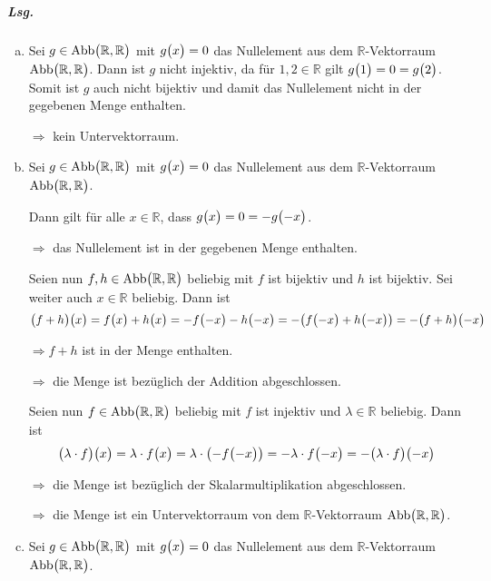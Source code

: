 \documentclass{scrreprt}
\begin{document}
  \subparagraph{Lsg.}
  \begin{enumerate}[(a)]
  \item Sei $g \in \text{Abb}\qty\big(\mathbb{R}, \mathbb{R})$ mit
    $g\qty\big(x) = 0$ das Nullelement aus dem $\mathbb{R}$-Vektorraum
    $\text{Abb}\qty\big(\mathbb{R}, \mathbb{R})$.
    Dann ist $g$ nicht injektiv, da für $1, 2 \in \mathbb{R}$ gilt
    $g\qty\big(1) = 0 = g\qty\big(2)$.
    Somit ist $g$ auch nicht bijektiv und damit das Nullelement nicht in der
    gegebenen Menge enthalten.

    $\Rightarrow$ kein Untervektorraum.

  \item Sei $g \in \text{Abb}\qty\big(\mathbb{R}, \mathbb{R})$ mit
    $g\qty\big(x) = 0$ das Nullelement aus dem $\mathbb{R}$-Vektorraum
    $\text{Abb}\qty\big(\mathbb{R}, \mathbb{R})$.

    Dann gilt für alle $x \in \mathbb{R}$, dass
    $g\qty\big(x) = 0 = -g\qty\big(-x)$.

    $\Rightarrow$ das Nullelement ist in der gegebenen Menge enthalten.

    Seien nun $f, h \in \text{Abb}\qty\big(\mathbb{R}, \mathbb{R})$ beliebig mit
    $f$ ist bijektiv und $h$ ist bijektiv.
    Sei weiter auch $x \in \mathbb{R}$ beliebig.
    Dann ist
    \[
      \qty\big(f + h)\qty\big(x) = f\qty\big(x) + h\qty\big(x)
      = -f\qty\big(-x) - h\qty\big(-x)
      = -\qty(f\qty\big(-x) + h\qty\big(-x))
      = -\qty\big(f + h)\qty\big(-x)
    \]

    $\Rightarrow f + h$ ist in der Menge enthalten.

    $\Rightarrow$ die Menge ist bezüglich der Addition abgeschlossen.

    Seien nun $f \in \text{Abb}\qty\big(\mathbb{R}, \mathbb{R})$ beliebig mit
    $f$ ist injektiv und $\lambda \in \mathbb{R}$ beliebig.
    Dann ist
    \[
      \qty\big(\lambda \cdot f)\qty\big(x) = \lambda \cdot f\qty\big(x) = \lambda \cdot \qty(-f\qty\big(-x))
      = -\lambda \cdot f\qty\big(-x) = -\qty\big(\lambda \cdot f)\qty\big(-x)
    \]

    $\Rightarrow$ die Menge ist bezüglich der Skalarmultiplikation abgeschlossen.

    $\Rightarrow$ die Menge ist ein Untervektorraum von dem $\mathbb{R}$-Vektorraum
    $\text{Abb}\qty\big(\mathbb{R}, \mathbb{R})$.

  \item Sei $g \in \text{Abb}\qty\big(\mathbb{R}, \mathbb{R})$ mit
    $g\qty\big(x) = 0$ das Nullelement aus dem $\mathbb{R}$-Vektorraum
    $\text{Abb}\qty\big(\mathbb{R}, \mathbb{R})$.


\end{enumerate}
\end{document}
